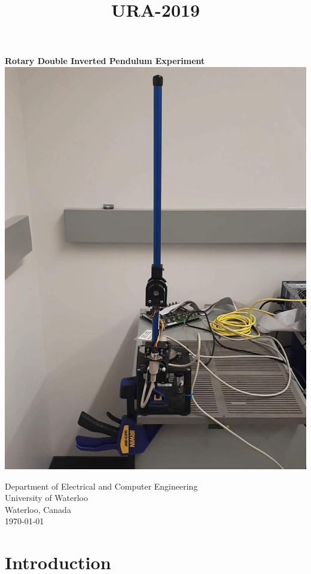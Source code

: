 \documentclass[12pt,letterpaper]{article}
\title{URA-2019}
\begin{document}
    \newpage
    \begin{titlepage}
        \centering
        \vspace {1.5cm}
        \Large{\textbf{Rotary Double Inverted Pendulum Experiment}} \\ [0.75cm]
        \includegraphics[scale=0.35]{img/front.jpg}
        \vspace {1.00cm}

        \normalsize{Department of Electrical and Computer Engineering \\
        University of Waterloo \\
        Waterloo, Canada} \\ [0.75 cm]
        \today
    \end{titlepage}
\newpage

\setcounter{page}{1}
\setlength{\parindent}{0pt}

\section{Introduction}
\end{document}
